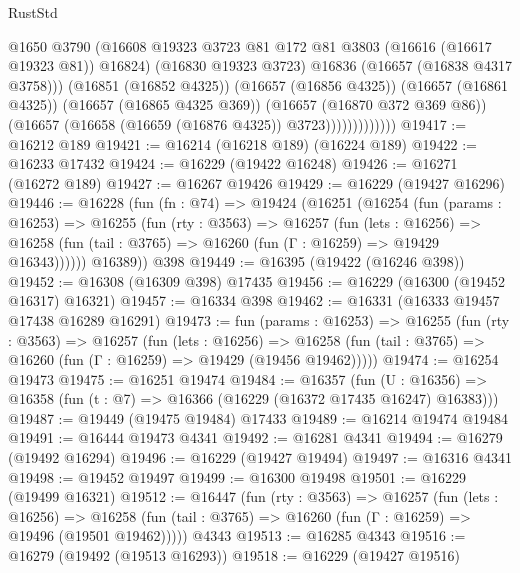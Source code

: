 \begin{lexlean}{RustStd}
\begin{coremodule}
                            @1650
                            @3790
                            (@16608
                              @19323
                              @3723
                              @81
                              @172
                              @81
                              @3803
                              (@16616 (@16617 @19323 @81))
                              @16824)
                            (@16830 @19323 @3723)
                            @16836
                            (@16657 (@16838 @4317 @3758)))
                          (@16851 (@16852 @4325))
                          (@16657 (@16856 @4325))
                          (@16657 (@16861 @4325))
                          (@16657 (@16865 @4325 @369))
                          (@16657 (@16870 @372 @369 @86))
                          (@16657 (@16658 (@16659 (@16876 @4325)) @3723)))))))))))))
@19417 := @16212 @189
@19421 := @16214 (@16218 @189) (@16224 @189)
@19422 := @16233 @17432
@19424 := @16229 (@19422 @16248)
@19426 := @16271 (@16272 @189)
@19427 := @16267 @19426
@19429 := @16229 (@19427 @16296)
@19446 := @16228
    (fun (fn : @74) =>
    @19424
      (@16251
        (@16254
          (fun (params : @16253) =>
          @16255
            (fun (rty : @3563) =>
            @16257
              (fun (lets : @16256) =>
              @16258 (fun (tail : @3765) => @16260 (fun (Γ : @16259) => @19429 @16343))))))
        @16389))
    @398
@19449 := @16395 (@19422 (@16246 @398))
@19452 := @16308 (@16309 @398) @17435
@19456 := @16229 (@16300 (@19452 @16317) @16321)
@19457 := @16334 @398
@19462 := @16331 (@16333 @19457 @17438 @16289 @16291)
@19473 := fun (params : @16253) =>
  @16255
    (fun (rty : @3563) =>
    @16257
      (fun (lets : @16256) =>
      @16258 (fun (tail : @3765) => @16260 (fun (Γ : @16259) => @19429 (@19456 @19462)))))
@19474 := @16254 @19473
@19475 := @16251 @19474
@19484 := @16357
    (fun (U : @16356) => @16358 (fun (t : @7) => @16366 (@16229 (@16372 @17435 @16247) @16383)))
@19487 := @19449 (@19475 @19484) @17433
@19489 := @16214 @19474 @19484
@19491 := @16444 @19473 @4341
@19492 := @16281 @4341
@19494 := @16279 (@19492 @16294)
@19496 := @16229 (@19427 @19494)
@19497 := @16316 @4341
@19498 := @19452 @19497
@19499 := @16300 @19498
@19501 := @16229 (@19499 @16321)
@19512 := @16447
    (fun (rty : @3563) =>
    @16257
      (fun (lets : @16256) =>
      @16258 (fun (tail : @3765) => @16260 (fun (Γ : @16259) => @19496 (@19501 @19462)))))
    @4343
@19513 := @16285 @4343
@19516 := @16279 (@19492 (@19513 @16293))
@19518 := @16229 (@19427 @19516)

\end{coremodule}
\end{lexlean}
